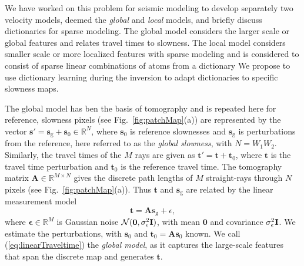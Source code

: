 We have worked on this problem for seismic modeling to develop separately two velocity models\cite{Bianco2018}, deemed the \textit{global} and \textit{local} models,  and briefly discuss dictionaries for sparse modeling. The global model considers the larger scale or global features and relates travel times to slowness. The local model considers smaller scale or more localized features with sparse modeling and is considered  to consist of sparse linear combinations of atoms from a dictionary
 We propose to use dictionary learning during the inversion to adapt dictionaries to specific slowness maps.

The global model has ben the basis of tomography and is repeated here for reference, slowness pixels (see Fig.~\ref{fig:patchMap}(a)) are represented by the vector $\mathbf{s'=s}_\mathrm{g}+\mathbf{s}_0\in\mathbb{R}^{N}$, where $\mathbf{s}_0$ is reference slownesses and $\mathbf{s}_\mathrm{g}$ is perturbations from the reference, here referred to as the {\it global slowness}, with $N=W_1W_2$. Similarly, the travel times of the $M$ rays are given as $\mathbf{t'=t+t}_0$, where $\mathbf{t}$ is the travel time perturbation and $\mathbf{t}_0$ is the reference travel time. The tomography matrix $\mathbf{A}\in\mathbb{R}^{M\times N}$ gives the discrete path lengths of $M$ straight-rays through $N$ pixels (see Fig.\ \ref{fig:patchMap}(a)). Thus  $\mathbf{t}$ and $\mathbf{s}_\mathrm{g}$ are related by the linear measurement model
%
\begin{equation}
\mathbf{t}=\mathbf{As}_\mathrm{g}+\epsilon,
\label{eq:linearTraveltime}
\end{equation}
%
where $\mathbf{\epsilon}\in\mathbb{R}^M$ is Gaussian noise $\mathcal{N}(\mathbf{0},\sigma_\epsilon^2\bf{I})$, with mean $\mathbf{0}$ and covariance $\sigma_\epsilon^2\bf{I}$. We estimate the perturbations, with $\mathbf{s}_0$ and $\mathbf{t}_0=\mathbf{A}\mathbf{s}_0$ known. We call (\ref{eq:linearTraveltime}) the \textit{global model}, as it captures the large-scale features that span the discrete map and generates $\mathbf{t}$. 

